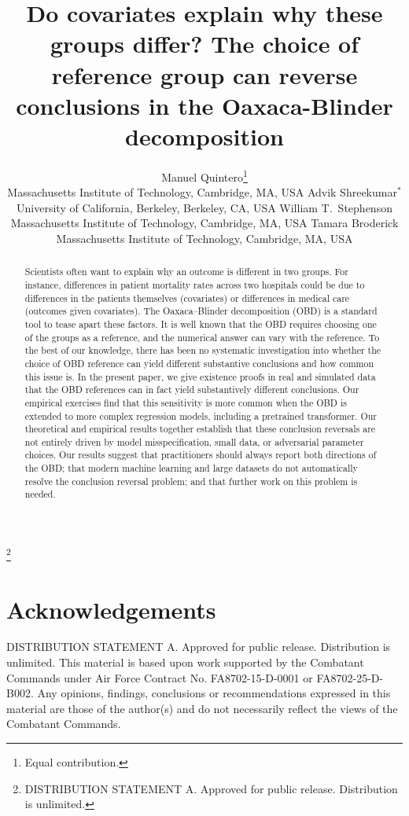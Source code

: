 \documentclass{article}
\title{Do covariates explain why these groups differ? The choice of reference group can reverse conclusions in the Oaxaca-Blinder decomposition}
\author{%
  Manuel Quintero\thanks{Equal contribution.} \\
  Massachusetts Institute of Technology, Cambridge, MA, USA
  \And
  Advik Shreekumar$^*$ \\
  University of California, Berkeley, Berkeley, CA, USA
  \And
  William T.~Stephenson \\
  Massachusetts Institute of Technology, Cambridge, MA, USA
  \And 
  Tamara Broderick \\
  Massachusetts Institute of Technology, Cambridge, MA, USA
}
\theoremstyle{definition}
\newcommand\blfootnote[1]{%
    \begingroup
    \renewcommand\thefootnote{}\footnote{#1}%
    \addtocounter{footnote}{-1}%
    \endgroup
  }
\begin{document}
\maketitle
\blfootnote{DISTRIBUTION STATEMENT A. Approved for public release. Distribution is unlimited.}

\begin{abstract}
Scientists often want to explain why an outcome is different in two groups. For instance, differences in patient mortality rates across two hospitals could be due to differences in the patients themselves (covariates) or differences in medical care (outcomes given covariates). The Oaxaca–Blinder decomposition (OBD) is a standard tool to tease apart these factors. It is well known that the OBD requires choosing one of the groups as a reference, and the numerical answer can vary with the reference. To the best of our knowledge, there has been no systematic investigation into whether the choice of OBD reference can yield different substantive conclusions and how common this issue is. In the present paper, we give existence proofs in real and simulated data that the OBD references can in fact yield substantively different conclusions. Our empirical exercises find that this sensitivity is more common when the OBD is extended to more complex regression models, including a pretrained transformer. Our theoretical and empirical results together establish that these conclusion reversals are not entirely driven by model misspecification, small data, or adversarial parameter choices. Our results suggest that practitioners should always report both directions of the OBD; that modern machine learning and large datasets do not automatically resolve the conclusion reversal problem; and that further work on this problem is needed.
\end{abstract}







\section*{Acknowledgements}

DISTRIBUTION STATEMENT A. Approved for public release. Distribution is unlimited. This material is based upon work supported by the Combatant Commands under Air Force Contract No. FA8702-15-D-0001 or FA8702-25-D-B002. Any opinions, findings, conclusions or recommendations expressed in this material are those of the author(s) and do not necessarily reflect the views of the Combatant Commands.
\end{document}
